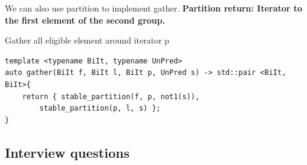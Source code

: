 \documentclass[a4paper,11pt,twoside]{book}
\begin{document}
	\par  We can also use partition to implement gather. \textbf{Partition return: Iterator to the first element of the second group.}

	\par  Gather all eligible element around iterator p
\begin{lstlisting}[numbers=none]
template <typename BiIt, typename UnPred> 
auto gather(BiIt f, BiIt l, BiIt p, UnPred s) -> std::pair <BiIt, BiIt>{
	return { stable_partition(f, p, not1(s)), 
		stable_partition(p, l, s) };
}		
\end{lstlisting}



\subsection{Interview questions}
\end{document}
